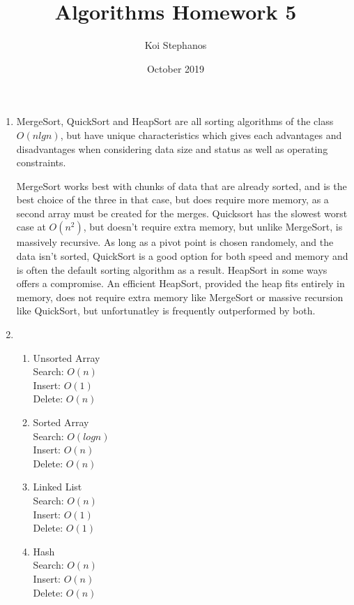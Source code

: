 \documentclass{article}
\title{Algorithms Homework 5}
\author{Koi Stephanos}
\date{October 2019}
\begin{document}
\maketitle

\begin{enumerate}
\item
    MergeSort, QuickSort and HeapSort are all sorting algorithms of the class \(O(nlgn)\), but have unique characteristics which gives each advantages and disadvantages when considering data size and status as well as operating constraints. 
    
    MergeSort works best with chunks of data that are already sorted, and is the best choice of the three in that case, but does require more memory, as a second array must be created for the merges. Quicksort has the slowest worst case at \(O(n^2)\), but doesn't require extra memory, but unlike MergeSort, is massively recursive. As long as a pivot point is chosen randomely, and the data isn't sorted, QuickSort is a good option for both speed and memory and is often the default sorting algorithm as a result. HeapSort in some ways offers a compromise. An efficient HeapSort, provided the heap fits entirely in memory, does not require extra memory like MergeSort or massive recursion like QuickSort, but unfortunatley is frequently outperformed by both. 
\item
   \begin{enumerate}[label=(\alph*)]
        \item Unsorted Array
        \\[\medskipamount]
            Search: \(O(n)\)
            \\Insert: \(O(1)\)
            \\Delete: \(O(n)\)
            
        \item Sorted Array
        \\[\medskipamount]
        Search:	\(O(log n)\)
        \\Insert:	\(O(n)\)
        \\Delete:	\(O(n)\)
        
        \item Linked List
        \\[\medskipamount]
        Search:	\(O(n)\)
        \\Insert:	\(O(1)\)
        \\Delete:	\(O(1)\)
        
        \item Hash
        \\[\medskipamount]
        Search:	\(O(n)\)
        \\Insert:	\(O(n)\)
        \\Delete:	\(O(n)\)
        

\end{enumerate}
\end{enumerate}
\end{document}
